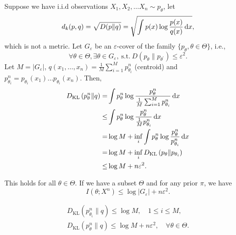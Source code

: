 Suppose we have i.i.d observations \(X_{1},X_{2},\ldots X_{n}\sim p_{\theta}\), let
\begin{equation}
	d_{k}(p,q)=\sqrt{D(p\|q)}=\sqrt{\int p(x)\log\frac{p(x)}{q(x)}\mathop{}\!\mathrm{d} x},
\end{equation}
which is not a metric. Let \(G_{\varepsilon}\) be an \(\varepsilon\)-cover of the family \(\{p_{\theta},\theta\in\Theta\}\), i.e.,
\begin{equation}
	\forall\theta\in\Theta,\exists\theta\in G_{\varepsilon},\ \text{s.t.}\ D\left(p_{\theta}\|p_{\theta^{\prime}}\right)\leq\varepsilon^{2}.
\end{equation}
Let \(M=\left|G_{\varepsilon}\right|\), \(q(x_{1},\ldots,x_{n})=\frac{1}{M}\sum_{i=1}^{M}p_{\theta_{i}}^{n}\) (centroid) and \(p_{\theta_{i}}^{n}=p_{\theta_{i}}(x_{1})\ldots p_{\theta_{i}}(x_{n})\). Then,
\begin{equation}
	\begin{aligned}
		D_{\text{KL}}\left(p_{\theta}^{n}\|q\right)= & \int p_{\theta}^{n}\log\frac{p_{\theta}^{n}}{\frac{1}{M}\sum_{i=1}^{M}p_{\theta_{i}}^{n}}\mathop{}\!\mathrm{d} x \\
		\leq                                         & \int p_{\theta}^{n}\log\frac{p_{\theta}^{n}}{\frac{1}{M}p_{\theta_{i}}^{n}}\mathop{}\!\mathrm{d} x               \\
		=                                            & \log M+\inf_{i}\int p_{\theta}^{n}\log\frac{p_{\theta}^{n}}{p_{\theta_{i}}^{n}}\mathop{}\!\mathrm{d} x           \\
		=                                            & \log M+\inf_{i}D_{\text{KL}}\left(p_{\theta}\|p_{\theta_{i}}\right)                             \\
		\leq                                         & \log M+n\varepsilon^{2}.
	\end{aligned}
\end{equation}

This holds for all \(\theta\in\Theta\). If we have a subset \(\Theta\) and for any prior \(\pi\), we have
\begin{equation}
	I\left(\theta;X^{n}\right)\leq\log|G_{\varepsilon}|+n\varepsilon^{2}.
\end{equation}

\begin{gather*}
	D_{\text{KL}}\left(p_{\theta_{i}}^{n}\|q\right)\leq\log M,\quad 1\leq i \leq M,\\
	D_{\text{KL}}\left(p_{\theta}^{n}\|q\right)\leq\log M+n\varepsilon^{2},\quad\forall\theta\in\Theta.
\end{gather*}


